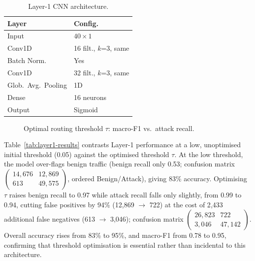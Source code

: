 \documentclass{llncs}
\begin{document}
\begin{table}[!htb]
\centering
\caption{Layer-1 CNN architecture.}
\label{tab:cnn}
\small
\begin{tabular}{ll}
\toprule
\textbf{Layer} & \textbf{Config.} \\
\midrule
Input                   & $40 \times 1$ \\
Conv1D                  & 16 filt., $k$=3, same \\
Batch Norm.             & Yes \\
Conv1D                  & 32 filt., $k$=3, same \\
Glob.\ Avg.\ Pooling    & 1D \\
Dense                   & 16 neurons \\
Output                  & Sigmoid \\
\bottomrule
\end{tabular}
\end{table}

\begin{figure}[!htb]
\centering
{}
\caption{Optimal routing threshold $\tau$: macro-F1 vs.\ attack recall.}
\label{fig:threshold}
\end{figure}

Table~\ref{tab:layer1-results} contrasts Layer-1 performance at a low, unoptimised initial threshold (0.05) against the optimised threshold $\tau$. At the low threshold, the model over-flags benign traffic (benign recall only 0.53; confusion matrix $\begin{pmatrix} 14{,}676 & 12{,}869 \\ 613 & 49{,}575 \end{pmatrix}$, ordered Benign/Attack), giving 83\% accuracy. Optimising $\tau$ raises benign recall to 0.97 while attack recall falls only slightly, from 0.99 to 0.94, cutting false positives by 94\% (12{,}869 $\to$ 722) at the cost of 2{,}433 additional false negatives (613 $\to$ 3{,}046); confusion matrix $\begin{pmatrix} 26{,}823 & 722 \\ 3{,}046 & 47{,}142 \end{pmatrix}$. Overall accuracy rises from 83\% to 95\%, and macro-F1 from 0.78 to 0.95, confirming that threshold optimisation is essential rather than incidental to this architecture.
\end{document}
